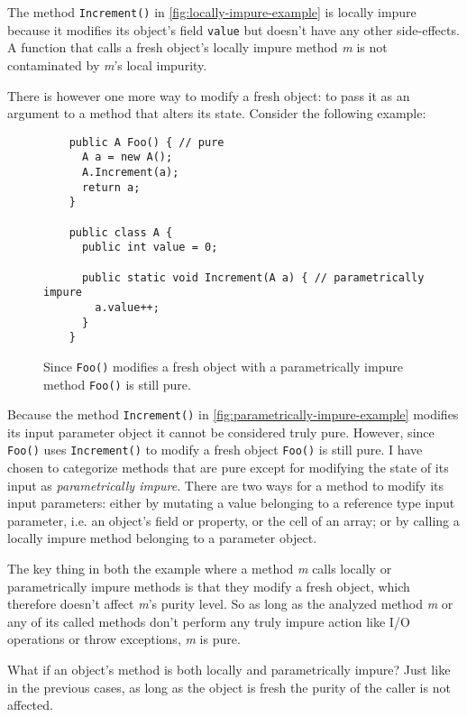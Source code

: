 \documentclass[a4paper,12pt]{article}
\begin{document}
The method \texttt{Increment()} in \autoref{fig:locally-impure-example} is locally impure because it modifies its object's field \texttt{value} but doesn't have any other side-effects. A function that calls a fresh object's locally impure method \textit{m} is not contaminated by \textit{m}'s local impurity.

There is however one more way to modify a fresh object: to pass it as an argument to a method that alters its state. Consider the following example:

\begin{figure}[H]
  \centering
  \begin{lstlisting}
    public A Foo() { // pure
      A a = new A();
      A.Increment(a);
      return a;
    }

    public class A {
      public int value = 0;

      public static void Increment(A a) { // parametrically impure
        a.value++;
      }
    }
  \end{lstlisting}
  \caption{Since \texttt{Foo()} modifies a fresh object with a parametrically impure method \texttt{Foo()} is still pure.}
  \label{fig:parametrically-impure-example}
\end{figure}

Because the method \texttt{Increment()} in \autoref{fig:parametrically-impure-example} modifies its input parameter object it cannot be considered truly pure. However, since \texttt{Foo()} uses \texttt{Increment()} to modify a fresh object \texttt{Foo()} is still pure. I have chosen to categorize methods that are pure except for modifying the state of its input as \textit{parametrically impure}. There are two ways for a method to modify its input parameters: either by mutating a value belonging to a reference type input parameter, i.e. an object's field or property, or the cell of an array; or by calling a locally impure method belonging to a parameter object.

The key thing in both the example where a method \textit{m} calls locally or parametrically impure methods is that they modify a fresh object, which therefore doesn't affect \textit{m}'s purity level. So as long as the analyzed method \textit{m} or any of its called methods don't perform any truly impure action like I/O operations or throw exceptions, \textit{m} is pure.

What if an object's method is both locally and parametrically impure? Just like in the previous cases, as long as the object is fresh the purity of the caller is not affected.
\end{document}
